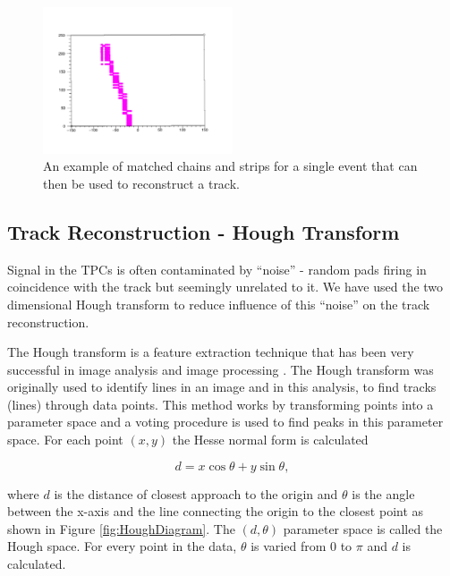 \documentclass[final,number,sort&compress,5p,times,twocolumn]{elsarticle}
\begin{document}
\begin{figure}[hbt!]
	\centering
    \includegraphics[width=0.5\textwidth]{figures/TexAT_Example_Track}
    \caption{An example of matched chains and strips for a single event that can then be used to reconstruct a track.}
    \label{fig:ChainStripExample}
\end{figure}

\subsection{Track Reconstruction - Hough Transform}

Signal in the TPCs is often contaminated by ``noise'' - random pads firing in coincidence with the  track but seemingly unrelated to it. We have used the two dimensional Hough transform to reduce influence of this ``noise'' on the track reconstruction.

The Hough transform is a feature extraction technique that has been very successful in image analysis and image processing \cite{Duda:1972}. The Hough transform was originally used to identify lines in an image and in this analysis, to find tracks (lines) through data points. This method works by transforming points into a parameter space and a voting procedure is used to find peaks in this parameter space. For each point $(x, y)$ the Hesse normal form is calculated

\begin{equation}
	d = x \cos \theta + y \sin \theta,
	\label{eq:Hesse}
\end{equation}

where $d$ is the distance of closest approach to the origin and $\theta$ is the angle between the x-axis and the line connecting the origin to the closest point as shown in Figure \ref{fig:HoughDiagram}. The $(d, \theta)$ parameter space is called the Hough space. For every point in the data, $\theta$ is varied from $0$ to $\pi$ and $d$ is calculated.
\end{document}
